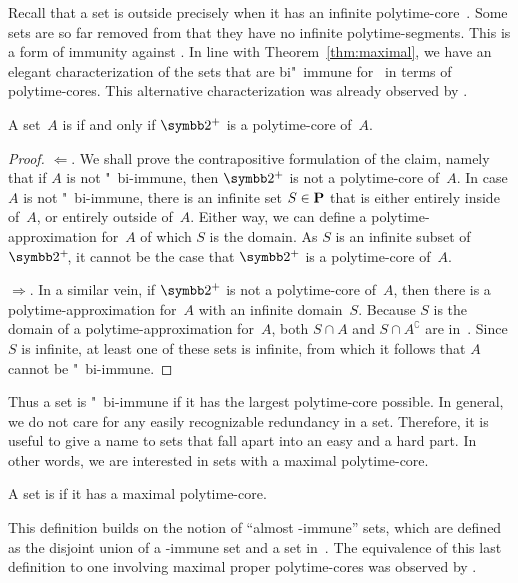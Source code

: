 Recall that a set is outside  precisely when it has an infinite polytime-core~\parencite{lynch1975reducibility}.
Some sets are so far removed from  that they have no infinite polytime-segments.
This is a form of immunity against .
In line with Theorem~\ref{thm:maximal}, we have an elegant characterization of the sets that are bi"~immune for~ in terms of polytime-cores.
This alternative characterization was already observed by \textcite{balcazar1985bi-immune} \parencite[see also][]{book1988polynomial}.
\begin{theorem}
  A set~$A$ is  if and only if $\binary^+$ is a polytime-core of~$A$.
\end{theorem}
\begin{proof}
  $\Longleftarrow$.
  We shall prove the contrapositive formulation of the claim, namely that if $A$ is not "~bi-immune, then $\binary^+$ is not a polytime-core of~$A$.
  In case $A$ is not "~bi-immune, there is an infinite set $S \in \textnormal{\textbf{P}}$ that is either entirely inside of~$A$, or entirely outside of~$A$.
  Either way, we can define a polytime-approximation for~$A$ of which $S$ is the domain.
  As $S$ is an infinite subset of~$\binary^+\!$, it cannot be the case that $\binary^+$ is a polytime-core of~$A$.

  $\Longrightarrow$.
  In a similar vein, if $\binary^+$ is not a polytime-core of~$A$, then there is a polytime-approximation for~$A$ with an infinite domain~$S$.
  Because $S$ is the domain of a polytime-approximation for~$A$, both $S \cap A$ and $S \cap A^\complement$ are in~.
  Since $S$ is infinite, at least one of these sets is infinite, from which it follows that $A$ cannot be "~bi-immune.
\end{proof}

Thus a set is "~bi-immune if it has the largest polytime-core possible.
In general, we do not care for any easily recognizable redundancy in a set.
Therefore, it is useful to give a name to sets that fall apart into an easy and a hard part.
In other words, we are interested in sets with a maximal polytime-core.
\begin{definition}
  A set is  if it has a maximal polytime-core.
\end{definition}
This definition builds on the notion of \enquote{almost -immune} sets, which are defined as the disjoint union of a -immune set and a set in~.
The equivalence of this last definition to one involving maximal proper polytime-cores was observed by \textcite{orponen1986classification}.

